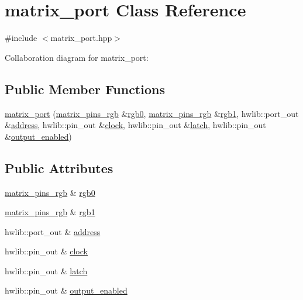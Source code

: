 \hypertarget{classmatrix__port}{}\section{matrix\+\_\+port Class Reference}
\label{classmatrix__port}


{\ttfamily \#include $<$matrix\+\_\+port.\+hpp$>$}



Collaboration diagram for matrix\+\_\+port\+:
\subsection*{Public Member Functions}
\begin{DoxyCompactItemize}
\item 
\hyperlink{classmatrix__port_a2d434ce8c9de69cab5408cae50e9d84a}{matrix\+\_\+port} (\hyperlink{classmatrix__pins__rgb}{matrix\+\_\+pins\+\_\+rgb} \&\hyperlink{classmatrix__port_a9678daa3c1c16c154c70d8668eb46bfb}{rgb0}, \hyperlink{classmatrix__pins__rgb}{matrix\+\_\+pins\+\_\+rgb} \&\hyperlink{classmatrix__port_a0c76660c065e0c329c723d02973d0c20}{rgb1}, hwlib\+::port\+\_\+out \&\hyperlink{classmatrix__port_a9c216b02627d4b595dfb5a4f64547df2}{address}, hwlib\+::pin\+\_\+out \&\hyperlink{classmatrix__port_a47aa87268e48885ae262d24d956a2fe1}{clock}, hwlib\+::pin\+\_\+out \&\hyperlink{classmatrix__port_a98a55b7d0a8ce1ba4c03a82b7a25c0da}{latch}, hwlib\+::pin\+\_\+out \&\hyperlink{classmatrix__port_a6a012fe246f37dc2ade3856527ae96dd}{output\+\_\+enabled})
\end{DoxyCompactItemize}
\subsection*{Public Attributes}
\begin{DoxyCompactItemize}
\item 
\hyperlink{classmatrix__pins__rgb}{matrix\+\_\+pins\+\_\+rgb} \& \hyperlink{classmatrix__port_a9678daa3c1c16c154c70d8668eb46bfb}{rgb0}
\item 
\hyperlink{classmatrix__pins__rgb}{matrix\+\_\+pins\+\_\+rgb} \& \hyperlink{classmatrix__port_a0c76660c065e0c329c723d02973d0c20}{rgb1}
\item 
hwlib\+::port\+\_\+out \& \hyperlink{classmatrix__port_a9c216b02627d4b595dfb5a4f64547df2}{address}
\item 
hwlib\+::pin\+\_\+out \& \hyperlink{classmatrix__port_a47aa87268e48885ae262d24d956a2fe1}{clock}
\item 
hwlib\+::pin\+\_\+out \& \hyperlink{classmatrix__port_a98a55b7d0a8ce1ba4c03a82b7a25c0da}{latch}
\item 
hwlib\+::pin\+\_\+out \& \hyperlink{classmatrix__port_a6a012fe246f37dc2ade3856527ae96dd}{output\+\_\+enabled}
\end{DoxyCompactItemize}


